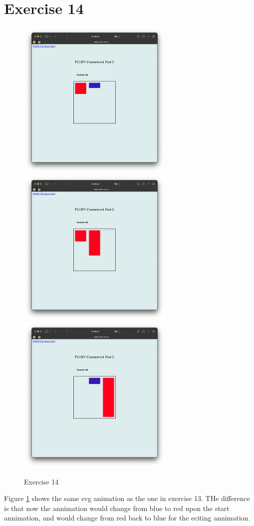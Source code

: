 \documentclass{scrreprt}
\begin{document}
\newpage
\section{Exercise 14}
\begin{figure}[!ht]
    \centering
    \includegraphics[width = 7.5cm]{images/ex14_1.png}
    \includegraphics[width = 7.5cm]{images/ex14_2.png}
    \includegraphics[width = 7.5cm]{images/ex14_3.png}
    \label{fig:ex14}
    \caption{Exercise 14}
\end{figure}
\FloatBarrier
% 
Figure \ref{fig:ex14} shows the same svg animation as the one in exercise 13. THe difference is that now the annimation would change from blue to red upon the start annimation, and would change from red back to blue for the eciting annimation.
\end{document}
